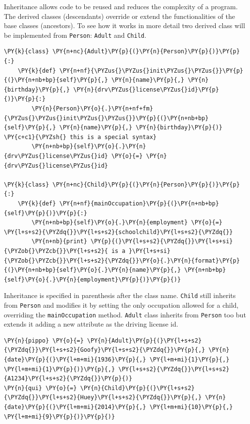 Inheritance allows code to be reused and reduces the complexity of a
program. The derived classes (descendants) override or extend the
functionalities of the base classes (ancestors).
To see how it works in more detail two derived class will be implemented from \texttt{Person}: 
\texttt{Adult} and \texttt{Child}.

\begin{codebox}
\begin{Verbatim}[commandchars=\\\{\}]
\PY{k}{class} \PY{n+nc}{Adult}\PY{p}{(}\PY{n}{Person}\PY{p}{)}\PY{p}{:}
    \PY{k}{def} \PY{n+nf}{\PYZus{}\PYZus{}init\PYZus{}\PYZus{}}\PY{p}{(}\PY{n+nb+bp}{self}\PY{p}{,} \PY{n}{name}\PY{p}{,} \PY{n}{birthday}\PY{p}{,} \PY{n}{drv\PYZus{}license\PYZus{}id}\PY{p}{)}\PY{p}{:}
        \PY{n}{Person}\PY{o}{.}\PY{n+nf+fm}{\PYZus{}\PYZus{}init\PYZus{}\PYZus{}}\PY{p}{(}\PY{n+nb+bp}{self}\PY{p}{,} \PY{n}{name}\PY{p}{,} \PY{n}{birthday}\PY{p}{)} \PY{c+c1}{\PYZsh{} this is a special syntax}
        \PY{n+nb+bp}{self}\PY{o}{.}\PY{n}{drv\PYZus{}license\PYZus{}id} \PY{o}{=} \PY{n}{drv\PYZus{}license\PYZus{}id}

\PY{k}{class} \PY{n+nc}{Child}\PY{p}{(}\PY{n}{Person}\PY{p}{)}\PY{p}{:}
    \PY{k}{def} \PY{n+nf}{mainOccupation}\PY{p}{(}\PY{n+nb+bp}{self}\PY{p}{)}\PY{p}{:}
        \PY{n+nb+bp}{self}\PY{o}{.}\PY{n}{employment} \PY{o}{=} \PY{l+s+s2}{\PYZdq{}}\PY{l+s+s2}{schoolchild}\PY{l+s+s2}{\PYZdq{}}
        \PY{n+nb}{print} \PY{p}{(}\PY{l+s+s2}{\PYZdq{}}\PY{l+s+si}{\PYZob{}\PYZcb{}}\PY{l+s+s2}{ is a }\PY{l+s+si}{\PYZob{}\PYZcb{}}\PY{l+s+s2}{\PYZdq{}}\PY{o}{.}\PY{n}{format}\PY{p}{(}\PY{n+nb+bp}{self}\PY{o}{.}\PY{n}{name}\PY{p}{,} \PY{n+nb+bp}{self}\PY{o}{.}\PY{n}{employment}\PY{p}{)}\PY{p}{)}
\end{Verbatim}
\end{codebox}

Inheritance is specified in parenthesis after the class name.
\texttt{Child} still inherits from \texttt{Person} and modifies it by setting the only occupation 
allowed for a child, overriding the \texttt{mainOccupation} method.
\texttt{Adult} class inherits from \texttt{Person} too but extends it adding
a new attribute as the driving license id. 

\begin{codebox}
\begin{Verbatim}[commandchars=\\\{\}]
\PY{n}{pippo} \PY{o}{=} \PY{n}{Adult}\PY{p}{(}\PY{l+s+s2}{\PYZdq{}}\PY{l+s+s2}{Goofy}\PY{l+s+s2}{\PYZdq{}}\PY{p}{,} \PY{n}{date}\PY{p}{(}\PY{l+m+mi}{1936}\PY{p}{,} \PY{l+m+mi}{1}\PY{p}{,} \PY{l+m+mi}{1}\PY{p}{)}\PY{p}{,} \PY{l+s+s2}{\PYZdq{}}\PY{l+s+s2}{A1234}\PY{l+s+s2}{\PYZdq{}}\PY{p}{)}
\PY{n}{qui} \PY{o}{=} \PY{n}{Child}\PY{p}{(}\PY{l+s+s2}{\PYZdq{}}\PY{l+s+s2}{Huey}\PY{l+s+s2}{\PYZdq{}}\PY{p}{,} \PY{n}{date}\PY{p}{(}\PY{l+m+mi}{2014}\PY{p}{,} \PY{l+m+mi}{10}\PY{p}{,} \PY{l+m+mi}{9}\PY{p}{)}\PY{p}{)}
\end{Verbatim}
\end{codebox}

